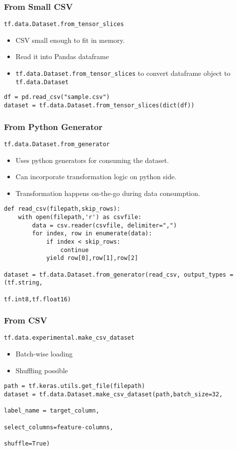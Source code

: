 \begin{frame}[fragile]\frametitle{From Small CSV}
\lstinline|tf.data.Dataset.from_tensor_slices|

\begin{itemize}
\item CSV small enough to fit in memory.
\item Read it into Pandas dataframe
\item \lstinline|tf.data.Dataset.from_tensor_slices| to convert dataframe object to \lstinline|tf.data.Dataset|
\end{itemize}

\begin{lstlisting}
df = pd.read_csv("sample.csv")
dataset = tf.data.Dataset.from_tensor_slices(dict(df))
\end{lstlisting}
\end{frame}

\begin{frame}[fragile]\frametitle{From Python Generator}
\lstinline|tf.data.Dataset.from_generator|

\begin{itemize}
\item Uses python generators for consuming the dataset.
\item Can incorporate transformation logic on python side.
\item Transformation happens on-the-go during data consumption.
\end{itemize}

\begin{lstlisting}
def read_csv(filepath,skip_rows):
	with open(filepath,'r') as csvfile:
		data = csv.reader(csvfile, delimiter=",")
		for index, row in enumerate(data):
			if index < skip_rows:
				continue
			yield row[0],row[1],row[2]
			
dataset = tf.data.Dataset.from_generator(read_csv, output_types =(tf.string,
																					tf.int8,tf.float16)
\end{lstlisting}
\end{frame}

\begin{frame}[fragile]\frametitle{From CSV}
\lstinline|tf.data.experimental.make_csv_dataset|

\begin{itemize}
\item Batch-wise loading
\item Shuffling possible
\end{itemize}

\begin{lstlisting}
path = tf.keras.utils.get_file(filepath)
dataset = tf.data.Dataset.make_csv_dataset(path,batch_size=32,
																						label_name = target_column,
																						select_columns=feature-columns,
																						shuffle=True)
\end{lstlisting}
\end{frame}

